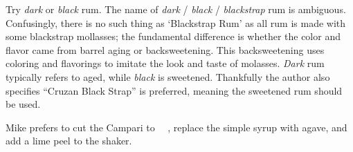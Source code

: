\begin{variation}
\item Try \emph{dark} or \emph{black} rum.
    The name of \emph{dark} / \emph{black} / \emph{blackstrap} rum is ambiguous.
    Confusingly, there is no such thing as `Blackstrap Rum' as all rum is
    made with some blackstrap mollasses;
    the fundamental difference is whether the color and flavor came from
    barrel aging or backsweetening\cite{whatIsBlackstrapRum}.
    This backsweetening uses coloring and flavorings to imitate the look and
    taste of molasses.
    \emph{Dark} rum typically refers to aged, while \emph{black} is sweetened.
    Thankfully the author also specifies ``Cruzan Black Strap'' is
    preferred\cite{originalJungleBird}\cite{giuseppeJungleBird}, meaning the
    sweetened rum should be used.
\item Mike prefers to cut the Campari to \onehalf~\fluidounce~, replace the
    simple syrup with agave, and add a lime peel to the shaker.
\end{variation}

\recipeend
